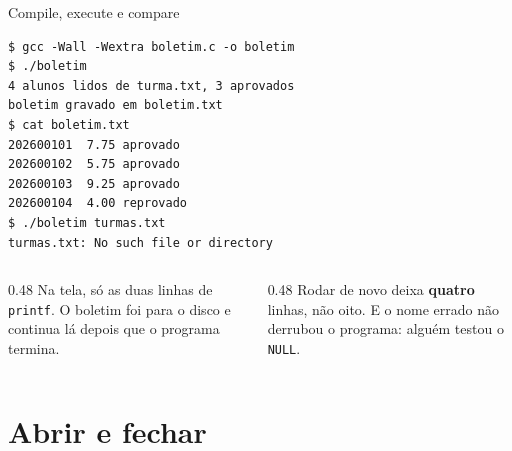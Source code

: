 \documentclass[aspectratio=169]{beamer}
\begin{document}
\begin{frame}[fragile]{Compile, execute e compare}
\begin{lstlisting}[style=shellStyle]
$ gcc -Wall -Wextra boletim.c -o boletim
$ ./boletim
4 alunos lidos de turma.txt, 3 aprovados
boletim gravado em boletim.txt
$ cat boletim.txt
202600101  7.75 aprovado
202600102  5.75 aprovado
202600103  9.25 aprovado
202600104  4.00 reprovado
$ ./boletim turmas.txt
turmas.txt: No such file or directory
\end{lstlisting}
  \begin{columns}[T]
    \begin{column}{0.48\textwidth}
      \small Na tela, só as duas linhas de \texttt{printf}. O boletim foi
      para o disco e continua lá depois que o programa termina.
    \end{column}
    \begin{column}{0.48\textwidth}
      \small Rodar de novo deixa \textbf{quatro} linhas, não oito. E o nome
      errado não derrubou o programa: alguém testou o \texttt{NULL}.
    \end{column}
  \end{columns}
\end{frame}

\section{Abrir e fechar}
\end{document}
